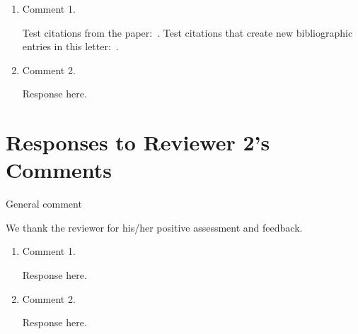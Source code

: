 \documentclass[11pt]{article}
\begin{document}
\begin{enumerate}[label=R1.\arabic*] %

    \item \begin{rcomment}
              Comment 1.
          \end{rcomment}

          \begin{response}
              \begin{bullets}
                  Test citations from the paper:~\cite{P-kay1}.
                  Test citations that create new bibliographic entries in this letter:~\cite{wilson2009regularization,wilson2010tomography}.

              \end{bullets}

          \end{response}

    \item \begin{rcomment}
              Comment 2.
          \end{rcomment}
          \begin{response}
              Response here.
          \end{response}
\end{enumerate}

\section*{Responses to Reviewer 2's Comments}

\begin{rcomment}
    General comment
\end{rcomment}

\vspace*{0.5em} \noindent
\begin{response}
    We thank the reviewer for his/her positive assessment and feedback.
\end{response}

\begin{enumerate}[label=R2.\arabic*]

    \item \begin{rcomment}
              Comment 1.
          \end{rcomment}

          \begin{response}
              Response here.
          \end{response}

    \item \begin{rcomment}
              Comment 2.
          \end{rcomment}

          \begin{response}
              Response here.
          \end{response}
\end{enumerate}

\printmybibliography
\end{document}
